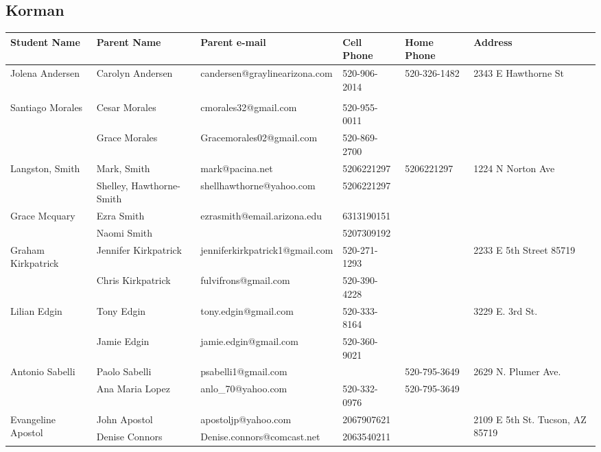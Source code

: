 \documentclass[landscape]{article}\usepackage[]{graphicx}\usepackage[]{color}
\begin{document}
\subsection{Korman}
\begin{longtable}{p{70pt}|p{75pt}|p{120pt}|p{60pt}|p{60pt}|p{120pt}|}
Student Name & Parent Name & Parent e-mail & Cell Phone & Home Phone & Address\\
\hline
\multirow{2}{70pt}{Jolena Andersen} & Carolyn Andersen & candersen@graylinearizona.com & 520-906-2014 & 520-326-1482 & \multirow{2}{100pt}{2343 E Hawthorne St} \\
 &  &  &  &  & \\
\hline
\multirow{2}{70pt}{Santiago Morales } & Cesar Morales & cmorales32@gmail.com & 520-955-0011 &  & \multirow{2}{100pt}{} \\
 & Grace Morales  & Gracemorales02@gmail.com & 520-869-2700 &  & \\
\hline
\multirow{2}{70pt}{Langston, Smith} & Mark, Smith & mark@pacina.net & 5206221297 & 5206221297 & \multirow{2}{100pt}{1224 N Norton Ave} \\
 & Shelley, Hawthorne-Smith & shellhawthorne@yahoo.com & 5206221297 &  & \\
\hline
\multirow{2}{70pt}{Grace Mcquary} & Ezra Smith & ezrasmith@email.arizona.edu & 6313190151 &  & \multirow{2}{100pt}{} \\
 & Naomi Smith &  & 5207309192 &  & \\
\hline
\multirow{2}{70pt}{Graham Kirkpatrick} & Jennifer Kirkpatrick & jenniferkirkpatrick1@gmail.com & 520-271-1293 &  & \multirow{2}{100pt}{2233 E 5th Street 85719} \\
 & Chris Kirkpatrick & fulvifrons@gmail.com & 520-390-4228 &  & \\
\hline
\multirow{2}{70pt}{Lilian Edgin} & Tony Edgin & tony.edgin@gmail.com & 520-333-8164 &  & \multirow{2}{100pt}{3229 E. 3rd St.} \\
 & Jamie Edgin & jamie.edgin@gmail.com & 520-360-9021 &  & \\
\hline
\multirow{2}{70pt}{Antonio Sabelli} & Paolo Sabelli & psabelli1@gmail.com &  & 520-795-3649 & \multirow{2}{100pt}{2629 N. Plumer Ave.} \\
 & Ana Maria Lopez & anlo\_70@yahoo.com & 520-332-0976 & 520-795-3649 & \\
\hline
\multirow{2}{70pt}{Evangeline Apostol} & John Apostol & apostoljp@yahoo.com & 2067907621 &  & \multirow{2}{100pt}{2109 E 5th St. Tucson, AZ 85719} \\
 & Denise Connors & Denise.connors@comcast.net & 2063540211 &  & \\

\end{longtable}
\end{document}
